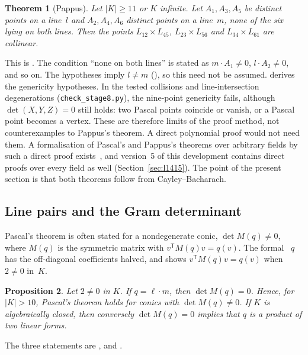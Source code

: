 \documentclass[11pt]{article}
\newtheorem{theorem}{Theorem}
\newtheorem{proposition}[theorem]{Proposition}
\theoremstyle{definition}
\theoremstyle{remark}
\begin{document}
\begin{theorem}[Pappus]\label{thm:pappus}
Let $|K|\ge11$ or $K$ infinite. Let $A_1,A_3,A_5$ be distinct points on a line~$l$ and
$A_2,A_4,A_6$ distinct points on a line~$m$, none of the six lying on both lines. Then the points
$L_{12}\times L_{45}$, $L_{23}\times L_{56}$ and $L_{34}\times L_{61}$ are collinear.
\end{theorem}

This is . The condition ``none on both lines'' is stated as
$m\cdot A_1\ne 0$, $l\cdot A_2\ne0$, and so on. The hypotheses imply $l\ne m$
(), so this need not be assumed.  derives the
genericity hypotheses. In the tested collisions and line-intersection degenerations (\texttt{check\_stage8.py}), the
nine-point genericity fails, although $\det(X,Y,Z)=0$ still holds: two Pascal points coincide or
vanish, or a Pascal point becomes a vertex. These are therefore
limits of the proof method, not counterexamples to Pappus's theorem. A direct polynomial proof
would not need them. A formalisation of Pascal's and Pappus's theorems over arbitrary fields by
such a direct proof exists~\cite{PascalHexagon}, and version~5 of this development contains direct
proofs over every field as well (Section~\ref{sec:l1415}). The point of the present section is that both theorems follow
from Cayley--Bacharach.

\subsection{Line pairs and the Gram determinant}

Pascal's theorem is often stated for a nondegenerate conic, $\det M(q)\ne0$, where $M(q)$ is the
symmetric matrix with $v^{\mathsf T}M(q)v=q(v)$. The formal ~$q$ has the off-diagonal
coefficients halved, and  shows $v^{\mathsf T}M(q)v=q(v)$ when $2\ne0$ in~$K$.

\begin{proposition}\label{prop:gram}
Let $2\ne0$ in $K$. If $q=\ell\cdot m$, then $\det M(q)=0$. Hence, for $|K|>10$, Pascal's theorem
holds for conics with $\det M(q)\ne 0$. If $K$ is algebraically closed, then conversely $\det M(q)=0$
implies that $q$ is a product of two linear forms.
\end{proposition}

The three statements are ,  and
.
\end{document}
